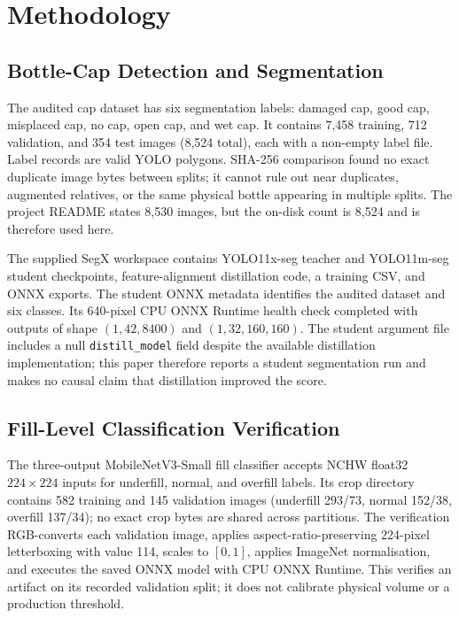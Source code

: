\documentclass[conference]{../IEEE_paper/IEEEtran}
\begin{document}
\section{Methodology}
\subsection{Bottle-Cap Detection and Segmentation}
The audited cap dataset has six segmentation labels: damaged cap, good cap, misplaced cap, no cap, open cap, and wet cap. It contains 7,458 training, 712 validation, and 354 test images (8,524 total), each with a non-empty label file. Label records are valid YOLO polygons. SHA-256 comparison found no exact duplicate image bytes between splits; it cannot rule out near duplicates, augmented relatives, or the same physical bottle appearing in multiple splits. The project README states 8,530 images, but the on-disk count is 8,524 and is therefore used here.

The supplied SegX workspace contains YOLO11x-seg teacher and YOLO11m-seg student checkpoints, feature-alignment distillation code, a training CSV, and ONNX exports. The student ONNX metadata identifies the audited dataset and six classes. Its 640-pixel CPU ONNX Runtime health check completed with outputs of shape $(1,42,8400)$ and $(1,32,160,160)$. The student argument file includes a null \texttt{distill\_model} field despite the available distillation implementation; this paper therefore reports a student segmentation run and makes no causal claim that distillation improved the score.

\subsection{Fill-Level Classification Verification}
The three-output MobileNetV3-Small fill classifier accepts NCHW float32 $224\times224$ inputs for underfill, normal, and overfill labels. Its crop directory contains 582 training and 145 validation images (underfill 293/73, normal 152/38, overfill 137/34); no exact crop bytes are shared across partitions. The verification RGB-converts each validation image, applies aspect-ratio-preserving 224-pixel letterboxing with value 114, scales to $[0,1]$, applies ImageNet normalisation, and executes the saved ONNX model with CPU ONNX Runtime. This verifies an artifact on its recorded validation split; it does not calibrate physical volume or a production threshold.
\end{document}
